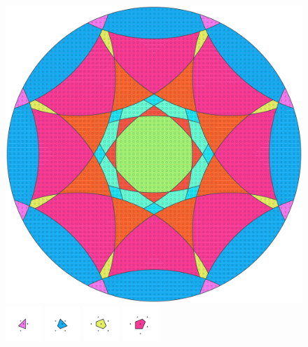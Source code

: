 \documentclass[text.tex]{subfiles}
\begin{document}
\clearpage
\pagestyle{fancy}
\fancyhf{}
\begin{figure}[h!]
\centering
\includegraphics[width=1\textwidth]{img/results/circle8/circle8_135281_(-287_120alpha_2).pdf}
\includegraphics[width=0.12\textwidth]{img/results/circle8/circle8_135281_(-287_120alpha_2)_001.pdf}
\includegraphics[width=0.12\textwidth]{img/results/circle8/circle8_135281_(-287_120alpha_2)_002.pdf}
\includegraphics[width=0.12\textwidth]{img/results/circle8/circle8_135281_(-287_120alpha_2)_003.pdf}
\includegraphics[width=0.12\textwidth]{img/results/circle8/circle8_135281_(-287_120alpha_2)_004.pdf}

\end{figure}
\end{document}
